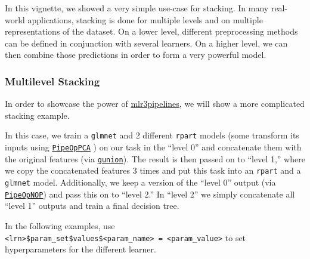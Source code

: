 \documentclass[
]{scrbook}
\begin{document}
In this vignette, we showed a very simple use-case for stacking.
In many real-world applications, stacking is done for multiple levels and on multiple representations of the dataset.
On a lower level, different preprocessing methods can be defined in conjunction with several learners.
On a higher level, we can then combine those predictions in order to form a very powerful model.

\hypertarget{multilevel-stacking}{%
\subsubsection{Multilevel Stacking}\label{multilevel-stacking}}

In order to showcase the power of \href{https://mlr3pipelines.mlr-org.com}{mlr3pipelines}, we will show a more complicated stacking example.

In this case, we train a \texttt{glmnet} and 2 different \texttt{rpart} models (some transform its inputs using \href{https://mlr3pipelines.mlr-org.com/reference/mlr_pipeops_pca.html}{\texttt{PipeOpPCA}} ) on our task in the ``level 0'' and concatenate them with the original features (via \href{https://mlr3pipelines.mlr-org.com/reference/gunion.html}{\texttt{gunion}}).
The result is then passed on to ``level 1,'' where we copy the concatenated features 3 times and put this task into an \texttt{rpart} and a \texttt{glmnet} model.
Additionally, we keep a version of the ``level 0'' output (via \href{https://mlr3pipelines.mlr-org.com/reference/mlr_pipeops_nop.html}{\texttt{PipeOpNOP}}) and pass this on to ``level 2.''
In ``level 2'' we simply concatenate all ``level 1'' outputs and train a final decision tree.

In the following examples, use \texttt{\textless{}lrn\textgreater{}\$param\_set\$values\$\textless{}param\_name\textgreater{}\ =\ \textless{}param\_value\textgreater{}} to set hyperparameters
for the different learner.
\end{document}
